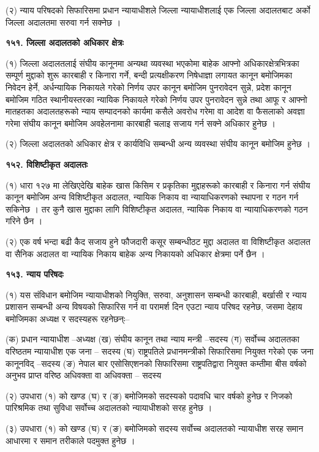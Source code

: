 (२) न्याय परिषदको सिफारिसमा प्रधान न्यायाधीशले जिल्ला न्यायाधीशलाई एक जिल्ला अदालतबाट अर्को जिल्ला अदालतमा सरुवा गर्न
सक्नेछ ।

\textbf{१५१. जिल्ला अदालतको अधिकार क्षेत्रः}

(१) जिल्ला अदालतलाई संघीय कानूनमा अन्यथा व्यवस्था भएकोमा बाहेक आफ्नो अधिकारक्षेत्रभित्रका सम्पूर्ण मुद्दाको शुरू कारबाही र किनारा गर्ने, बन्दी प्रत्यक्षीकरण निषेधाज्ञा लगायत कानून बमोजिमका निवेदन हेर्ने, अर्धन्यायिक निकायले गरेको निर्णय उपर कानून
बमोजिम पुनरावेदन सुन्ने, प्रदेश कानून बमोजिम गठित स्थानीयस्तरका न्यायिक निकायले गरेको निर्णय उपर पुनरावेदन सुन्ने तथा आफू र आफ्नो मातहतका अदालतहरूको न्याय सम्पादनको कार्यमा कसैले अवरोध गरेमा वा आदेश वा फैसलाको अवज्ञा गरेमा संघीय कानून बमोजिम अवहेलनामा कारबाही चलाइ सजाय गर्न सक्ने अधिकार हुनेछ ।

(२) जिल्ला अदालतको अधिकार क्षेत्र र कार्यविधि सम्बन्धी अन्य व्यवस्था संघीय कानून बमोजिम हुनेछ ।

\textbf{१५२. विशिष्टीकृत अदालतः}

(१) धारा १२७ मा लेखिएदेखि बाहेक खास किसिम र प्रकृतिका मुद्दाहरूको कारबाही र किनारा गर्न संघीय कानून बमोजिम अन्य विशिष्टीकृत अदालत, न्यायिक निकाय वा न्यायाधिकरणको स्थापना र गठन गर्न सकिनेछ । तर कुनै खास मुद्दाका लागि विशिष्टीकृत अदालत, न्यायिक निकाय वा न्यायाधिकरणको गठन गरिने छैन ।

(२) एक वर्ष भन्दा बढी कैद सजाय हुने फौजदारी कसूर सम्बन्धीठट मुद्दा अदालत वा विशिष्टीकृत अदालत वा सैनिक अदालत वा न्यायिक
निकाय बाहेक अन्य निकायको अधिकार क्षेत्रमा पर्ने छैन ।

\textbf{१५३. न्याय परिषदः}

(१) यस संविधान बमोजिम न्यायाधीशको नियुक्ति, सरुवा, अनुशासन सम्बन्धी कारबाही, बर्खासी र न्याय प्रशासन सम्बन्धी अन्य
विषयको सिफारिस गर्न वा परामर्श दिन एउटा न्याय परिषद रहनेछ, जसमा देहाय बमोजिमका अध्यक्ष र सदस्यहरू रहनेछन्ः–

(क) प्रधान न्यायाधीश –अध्यक्ष
(ख) संघीय कानून तथा न्याय मन्त्री –सदस्य
(ग) सर्वोच्च अदालतका वरिष्ठतम न्यायाधीश एक जना – सदस्य
(घ) राष्ट्रपतिले प्रधानमन्त्रीको सिफारिसमा नियुक्त गरेको एक जना कानूनविद् –सदस्य
(ङ) नेपाल बार एसोसिएशनको सिफारिसमा राष्ट्रपतिद्वारा नियुक्त कम्तीमा बीस वर्षको अनुभव प्राप्त वरिष्ठ अधिवक्ता वा अधिवक्ता – सदस्य

(२) उपधारा (१) को खण्ड (घ) र (ङ) बमोजिमको सदस्यको पदावधि चार वर्षको हुनेछ र निजको पारिश्रमिक तथा सुविधा सर्वोच्च अदालतको न्यायाधीशको सरह हुनेछ ।

(३) उपधारा (१) को खण्ड (घ) र (ङ) बमोजिमको सदस्य सर्वोच्च अदालतको न्यायाधीश सरह समान आधारमा र समान तरीकाले पदमुक्त
हुनेछ ।


